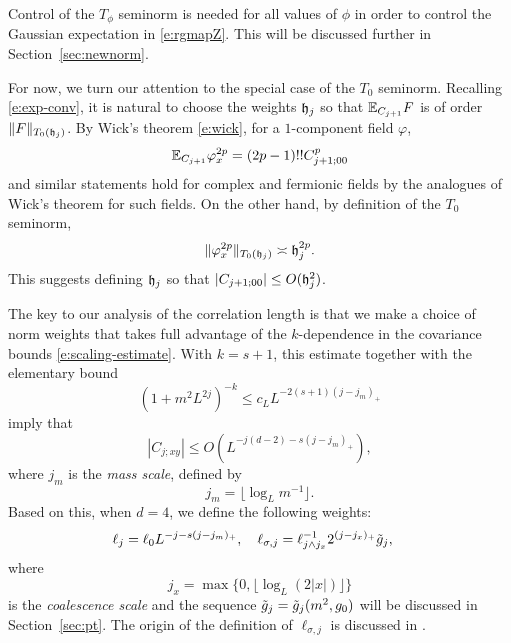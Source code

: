 Control of the $T_\phi$ seminorm is needed for all values of
$\phi$ in order to control the Gaussian expectation in \eqref{e:rgmapZ}.
This will be discussed further in Section~\ref{sec:newnorm}.

For now, we turn our attention to the special case of the $T_0$ seminorm. Recalling
\eqref{e:exp-conv}, it is natural to choose the weights $\mathfrak{h}_j$ so that
$\mathbb{E}_{C_{j+1}} F$ is of order $\|F\|_{T_0(\mathfrak{h}_j)}$.
By Wick's theorem \eqref{e:wick}, for a $1$-component field $\varphi$,
\begin{equation}
\mathbb{E}_{C_{j+1}} \varphi_x^{2p} = (2p - 1)!! C_{j+1;00}^p
\end{equation}
and similar statements hold for complex and fermionic fields by the analogues of
Wick's theorem for such fields.
On the other hand, by definition of the $T_0$ seminorm,
\begin{equation}
\label{e:gauss-moments}
\|\varphi_x^{2p}\|_{T_0(\mathfrak{h}_j)} \asymp \mathfrak{h}_j^{2p}.
\end{equation}
This suggests defining $\mathfrak{h}_j$ so that $|C_{j+1;00}| \le O(\mathfrak{h}^2_j)$.

The key to our analysis of the correlation length is that we make a choice of norm
weights that takes full advantage of the
$k$-dependence in the covariance bounds \eqref{e:scaling-estimate}.
With $k = s + 1$, this estimate together with the elementary bound
\begin{equation}
\label{e:mass-decay}
(1 + m^2 L^{2j})^{-k} \le c_L L^{-2(s+1)(j - j_m)_+}
\end{equation}
imply that
\begin{equation}
|C_{j;xy}| \le O(L^{-j (d - 2) - s (j - j_m)_+}),
\end{equation}
where $j_m$ is the \emph{mass scale}, defined by
\begin{equation}
\label{e:jmdef}
j_m	= \lfloor\log_{L} m^{-1}\rfloor.
\end{equation}
Based on this, when $d = 4$, we define the following weights:
\begin{align}
\label{e:elldef-zz}
\ell_j &= \ell_0 L^{-j - s (j - j_m)_+}, \quad
\ell_{\sigma,j}
=
\ell_{j \wedge j_{x}}^{-1} 2^{(j - j_{x})_+} \tilde{g}_j,
\end{align}
where
\begin{equation}
\label{e:jxdef}
j_x = \max\{0,\lfloor \log_{L} (2 |x|)\rfloor\}
\end{equation}
is the \emph{coalescence scale}
and the sequence $\tilde{g}_j = \tilde{g}_j(m^2,g_0)$ will be discussed
in Section~\ref{sec:pt}.
The origin of the definition of $\ell_{\sigma,j}$ is discussed in
\cite[Remark~\ref{IE-rk:hsigmot}]{BS-rg-IE}.

